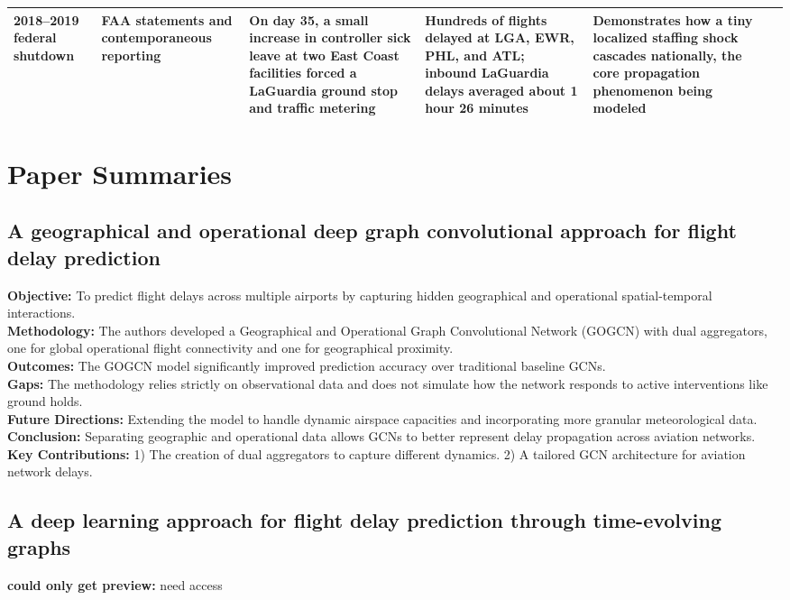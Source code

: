 \documentclass[twocolumn]{article}
\begin{document}
\begin{table}[htbp]
\begin{tabular}{|p{2.2cm}|p{2.6cm}|p{3.2cm}|p{3.2cm}|p{2.8cm}|p{1cm}|}
\hline
2018--2019 federal shutdown & FAA statements and contemporaneous reporting & On day 35, a small increase in controller sick leave at two East Coast facilities forced a LaGuardia ground stop and traffic metering & Hundreds of flights delayed at LGA, EWR, PHL, and ATL; inbound LaGuardia delays averaged about 1 hour 26 minutes & Demonstrates how a tiny localized staffing shock cascades nationally, the core propagation phenomenon being modeled & \cite{npr2019}\\
\hline
\end{tabular}
\end{table}

\section{Paper Summaries}

\subsection{A geographical and operational deep graph convolutional approach for flight delay prediction \cite{cai2023}}
\textbf{Objective:} To predict flight delays across multiple airports by capturing hidden geographical and operational spatial-temporal interactions. \\
\textbf{Methodology:} The authors developed a Geographical and Operational Graph Convolutional Network (GOGCN) with dual aggregators, one for global operational flight connectivity and one for geographical proximity. \\
\textbf{Outcomes:} The GOGCN model significantly improved prediction accuracy over traditional baseline GCNs. \\
\textbf{Gaps:} The methodology relies strictly on observational data and does not simulate how the network responds to active interventions like ground holds. \\
\textbf{Future Directions:} Extending the model to handle dynamic airspace capacities and incorporating more granular meteorological data. \\
\textbf{Conclusion:} Separating geographic and operational data allows GCNs to better represent delay propagation across aviation networks. \\
\textbf{Key Contributions:} 1) The creation of dual aggregators to capture different dynamics. 2) A tailored GCN architecture for aviation network delays.

\subsection{A deep learning approach for flight delay prediction through time-evolving graphs \cite{zeng2021}}
\textbf{could only get preview:} need access
\end{document}

